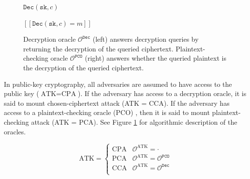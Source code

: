 \documentclass[letterpaper,12pt,titlepage,oneside,final]{book}
\newcommand{\decrypt}{\texttt{Dec}}
\newcommand{\sk}{\texttt{sk}}
\newcommand{\pco}{\texttt{PCO}}
\newcommand{\llbrack}{[\![}
\newcommand{\rrbrack}{]\!]}
\begin{document}
\begin{figure}[htbp]
    \centering
    \begin{minipage}[t]{0.4\textwidth}
        \begin{algorithm}[H]
            \caption*{$\mathcal{O}^\decrypt(c)$}
            \begin{algorithmic}[1]
                \State \Return $\decrypt(\sk, c)$
            \end{algorithmic}
        \end{algorithm}
    \end{minipage}\hfill
    \begin{minipage}[t]{0.4\textwidth}
        \begin{algorithm}[H]
            \caption*{$\mathcal{O}^\pco(m, c)$}
            \begin{algorithmic}[1]
                \State \Return $\llbrack \decrypt(\sk, c) = m \rrbrack$
            \end{algorithmic}
        \end{algorithm}
    \end{minipage}
    \caption{Decryption oracle $\mathcal{O}^\decrypt$ (left) answers decryption queries by returning the decryption of the queried ciphertext. Plaintext-checking oracle $\mathcal{O}^\pco$ (right) answers whether the queried plaintext is the decryption of the queried ciphertext.}\label{fig:pke-oracles}
\end{figure}

In public-key cryptography, all adversaries are assumed to have access to the public key ($\text{ATK} = \text{CPA}$). If the adversary has access to a decryption oracle, it is said to mount chosen-ciphertext attack (ATK = CCA). If the adversary has access to a plaintext-checking oracle (PCO) , then it is said to mount plaintext-checking attack (ATK = PCA). See Figure \ref{fig:pke-oracles} for algorithmic description of the oracles.

\begin{equation*}
    \text{ATK} = \begin{cases}
        \text{CPA} & \mathcal{O}^\text{ATK} = \cdot \\
        \text{PCA} & \mathcal{O}^\text{ATK} = \mathcal{O}^\pco \\
        \text{CCA} & \mathcal{O}^\text{ATK} = \mathcal{O}^\decrypt \\
    \end{cases}
\end{equation*}
\end{document}

